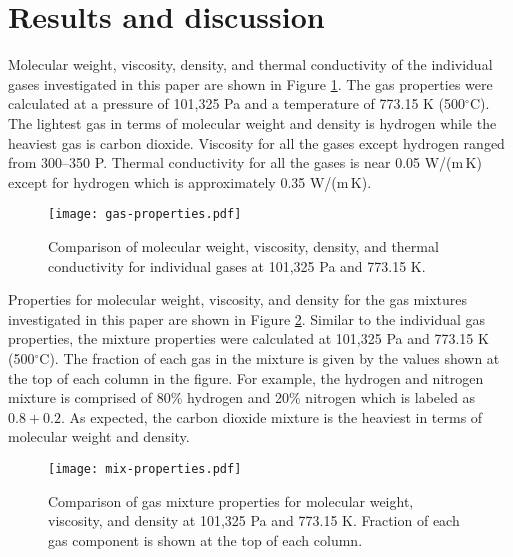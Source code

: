 
\section{Results and discussion}

Molecular weight, viscosity, density, and thermal conductivity of the individual gases investigated in this paper are shown in Figure \ref{fig:gas-properties}. The gas properties were calculated at a pressure of 101,325 Pa and a temperature of 773.15 K (500$^\circ$C). The lightest gas in terms of molecular weight and density is hydrogen while the heaviest gas is carbon dioxide. Viscosity for all the gases except hydrogen ranged from 300--350 \textmugreek P. Thermal conductivity for all the gases is near 0.05 W/(m\,K) except for hydrogen which is approximately 0.35 W/(m\,K).

\begin{figure}[ht]
    \centering
    \texttt{[image: gas-properties.pdf]}
    \caption{Comparison of molecular weight, viscosity, density, and thermal conductivity for individual gases at 101,325 Pa and 773.15 K.}
    \label{fig:gas-properties}
\end{figure}

Properties for molecular weight, viscosity, and density for the gas mixtures investigated in this paper are shown in Figure \ref{fig:mix-properties}. Similar to the individual gas properties, the mixture properties were calculated at 101,325 Pa and 773.15 K (500$^\circ$C). The fraction of each gas in the mixture is given by the values shown at the top of each column in the figure. For example, the hydrogen and nitrogen mixture is comprised of 80\% hydrogen and 20\% nitrogen which is labeled as $0.8 + 0.2$. As expected, the carbon dioxide mixture is the heaviest in terms of molecular weight and density.

\begin{figure}[ht]
    \centering
    \texttt{[image: mix-properties.pdf]}
    \caption{Comparison of gas mixture properties for molecular weight, viscosity, and density at 101,325 Pa and 773.15 K. Fraction of each gas component is shown at the top of each column.}
    \label{fig:mix-properties}
\end{figure}
